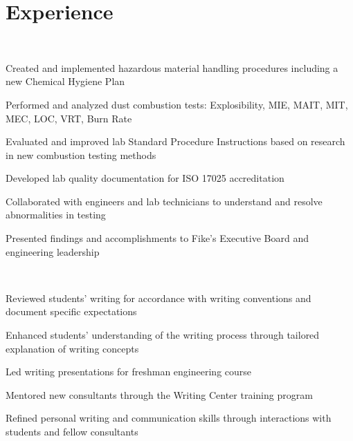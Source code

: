 \documentclass[]{deedy-resume-chloedorst}
\begin{document}
\begin{minipage}[t]{0.66\textwidth} 

\sectionsep
\section{Experience}
\sectionsep
{} 
\sectionsep \\
\vspace{\topsep} %
\begin{tightemize}
	\item Created and implemented hazardous material handling procedures including a new Chemical Hygiene Plan
	\item Performed and analyzed dust combustion tests: Explosibility, MIE, MAIT, MIT, MEC, LOC, VRT, Burn Rate
	\item Evaluated and improved lab Standard Procedure Instructions based on research in new combustion testing methods 
	\item Developed lab quality documentation for ISO 17025 accreditation
	\item Collaborated with engineers and lab technicians to understand and resolve abnormalities in testing
	\item Presented findings and accomplishments to Fike's Executive Board and engineering leadership 
\end{tightemize}
\sectionsep
\sectionsep
\sectionsep
{} 
\sectionsep\\
\begin{tightemize}
	\item Reviewed students' writing for accordance with writing conventions and document specific expectations
	\item Enhanced students' understanding of the writing process through tailored explanation of writing concepts
	\item Led writing presentations for freshman engineering course
	\item Mentored new consultants through the Writing Center training program
	\item Refined personal writing and communication skills through interactions with students and fellow consultants

\end{tightemize}
\end{minipage}
\end{document}
